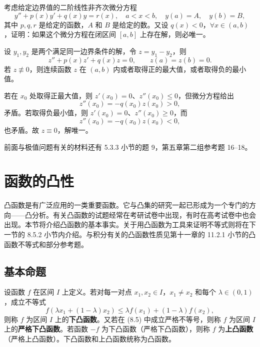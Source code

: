 \begin{xexercise}[8]
考虑给定边界值的二阶线性非齐次微分方程
  \[
    y''+p(x)y'+q(x)y=r(x),\quad a<x<b,\quad y(a)=A,\quad y(b)=B,
  \]
  其中 $p,q,r$ 是给定的函数，$A$ 和 $B$ 是给定的数。又设 $q(x)<0$，$\forall x\in(a,b)$，证明：如果这个微分方程在闭区间 $[a,b]$ 上存在解，则必唯一。
\end{xexercise}
\begin{xsolution}
设 $y_1,y_2$ 是两个满足同一边界条件的解，令 $z=y_1-y_2$，则
\[
  z''+p(x)z'+q(x)z=0,
  \qquad z(a)=z(b)=0.
\]
若 $z\not\equiv0$，则连续函数 $z$ 在 $(a,b)$ 内或者取得正的最大值，或者取得负的最小值。

若在 $x_0$ 处取得正最大值，则 $z'(x_0)=0$、$z''(x_0)\le0$，但微分方程给出
\[
  z''(x_0)=-q(x_0)z(x_0)>0,
\]
矛盾。若取得负最小值，则 $z'(x_0)=0$、$z''(x_0)\ge0$，而
\[
  z''(x_0)=-q(x_0)z(x_0)<0,
\]
也矛盾。故 $z\equiv0$，解唯一。
\end{xsolution}


\begin{xremark}
前面与极值问题有关的材料还有 5.3.3 小节的题 9，第五章第二组参考题 16--18。
\end{xremark}

\section{函数的凸性}

凸函数是有广泛应用的一类重要函数。它与凸集的研究一起已形成为一个专门的方向——凸分析。有关凸函数的试题经常在考研试卷中出现，有时在高考试卷中也会出现。本节将介绍凸函数的基本事实。关于用凸函数为工具来证明不等式则将在下一节的 8.5.2 小节内介绍。与积分有关的凸函数性质见第十一章的 11.2.1 小节的凸函数不等式和部分参考题。

\subsection{基本命题}

\begin{xdefinition}
设函数 $f$ 在区间 $I$ 上定义。若对每一对点 $x_1,x_2\in I$，$x_1\ne x_2$ 和每个 $\lambda\in(0,1)$，成立不等式
\begin{equation}
  f(\lambda x_1+(1-\lambda)x_2)\le\lambda f(x_1)+(1-\lambda)f(x_2),
  \tag{8.5}
  \label{eq:8.5}
\end{equation}
则称 $f$ 为区间 $I$ 上的\textbf{下凸函数}。又若在 (8.5) 中成立严格不等号，则称 $f$ 为区间 $I$ 上的\textbf{严格下凸函数}。若函数 $-f$ 为下凸函数（严格下凸函数），则称 $f$ 为\textbf{上凸函数}（严格上凸函数）。下凸函数和上凸函数统称为凸函数。
\end{xdefinition}

